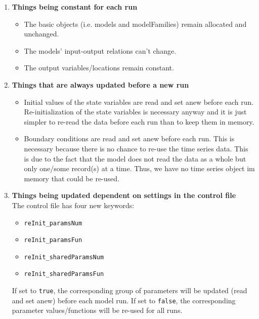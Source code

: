 \documentclass[a4paper,10pt]{article}
\begin{document}
\begin{enumerate}
  \item \textbf{Things being constant for each run}
		\begin{itemize}
			\item The basic objects (i.e. models and modelFamilies) remain allocated and unchanged.
			\item The models' input-output relations can't change.
			\item The output variables/locations remain constant.
		\end{itemize}
	\item \textbf{Things that are always updated before a new run}
		\begin{itemize}
			\item Initial values of the state variables are read and set anew before each run. Re-initialization of the state variables is necessary anyway and it is just simpler to re-read the data before each run than to keep them in memory.
			\item Boundary conditions are read and set anew before each run. This is necessary because there is no chance to re-use the time series data. This is due to the fact that the model does not read the data as a whole but only one/some record(s) at a time. Thus, we have no time series object im memory that could be re-used.
		\end{itemize}
  \item \textbf{Things being updated dependent on settings in the control file} \\ The control file has four new keywords:
		\begin{itemize}
			\item \verb!reInit_paramsNum!
			\item \verb!reInit_paramsFun!
			\item \verb!reInit_sharedParamsNum!
			\item \verb!reInit_sharedParamsFun!
		\end{itemize}
    If set to \verb!true!, the corresponding group of parameters will be updated (read and set anew) before each model run. If set to \verb!false!, the corresponding parameter values/functions will be re-used for all runs.
\end{enumerate}
\end{document}
